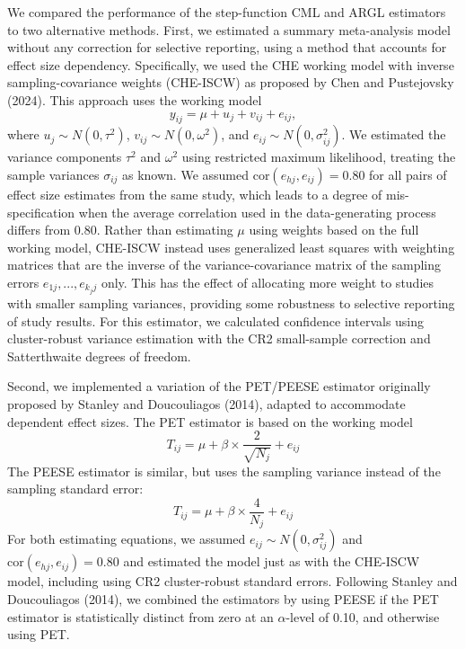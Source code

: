 \documentclass[
  man, donotrepeattitle,floatsintext]{apa7}
\begin{document}
We compared the performance of the step-function CML and ARGL estimators to two alternative methods.
First, we estimated a summary meta-analysis model without any correction for selective reporting, using a method that accounts for effect size dependency.
Specifically, we used the CHE working model with inverse sampling-covariance weights (CHE-ISCW) as proposed by Chen and Pustejovsky (2024).
This approach uses the working model
\begin{equation}
\label{eq:che}
y_{ij} = \mu + u_j + v_{ij} + e_{ij},
\end{equation}
where \(u_j \sim N(0, \tau^2)\), \(v_{ij} \sim N(0, \omega^2)\), and \(e_{ij} \sim N(0, \sigma_{ij}^2)\).
We estimated the variance components \(\tau^2\) and \(\omega^2\) using restricted maximum likelihood, treating the sample variances \(\sigma_{ij}\) as known.
We assumed \(\text{cor}(e_{hj},e_{ij} )=0.80\) for all pairs of effect size estimates from the same study, which leads to a
degree of mis-specification when the average correlation used in the data-generating process differs from 0.80.
Rather than estimating \(\mu\) using weights based on the full working model, CHE-ISCW instead uses generalized least squares with weighting matrices that are the inverse of the variance-covariance matrix of the sampling errors \(e_{1j},...,e_{k_j j}\) only.
This has the effect of allocating more weight to studies with smaller sampling variances, providing some robustness to selective reporting of study results.
For this estimator, we calculated confidence intervals using cluster-robust variance estimation with the CR2 small-sample correction and Satterthwaite degrees of freedom.

Second, we implemented a variation of the PET/PEESE estimator originally proposed by Stanley and Doucouliagos (2014), adapted to
accommodate dependent effect sizes. The PET estimator is based on the
working model \begin{equation}
\label{eq:pet}
T_{ij} = \mu + \beta \times \frac{2}{\sqrt{N_j}} + e_{ij}
\end{equation} The PEESE estimator is similar, but uses the sampling
variance instead of the sampling standard error: \begin{equation}
\label{eq:peese}
T_{ij} = \mu + \beta \times \frac{4}{N_j} + e_{ij}
\end{equation} For both estimating equations, we assumed
\(e_{ij} \sim N(0, \sigma_{ij}^2)\) and \(\text{cor}(e_{hj},e_{ij} )=0.80\) and
estimated the model just as with the CHE-ISCW model, including using
CR2 cluster-robust standard errors. Following Stanley and Doucouliagos (2014), we combined
the estimators by using PEESE if the PET estimator is statistically
distinct from zero at an \(\alpha\)-level of 0.10, and otherwise using PET.
\end{document}
